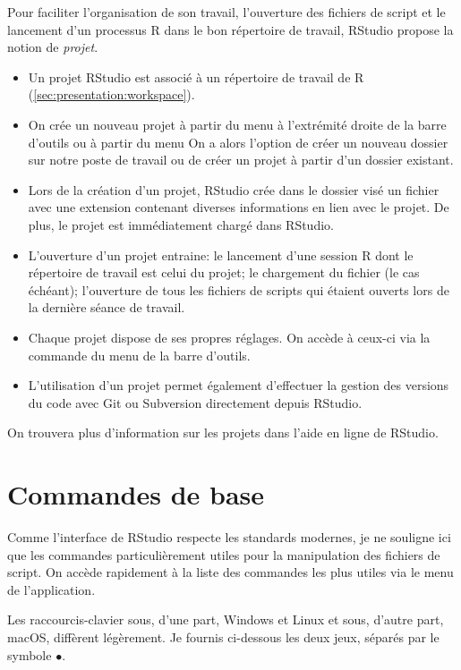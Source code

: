 Pour faciliter l'organisation de son travail, l'ouverture des fichiers
de script et le lancement d'un processus R dans le bon répertoire de
travail, RStudio propose la notion de \emph{projet}.
\begin{itemize}
\item Un projet RStudio est associé à un répertoire de travail de R
  (\autoref{sec:presentation:workspace}).
\item On crée un nouveau projet à partir du menu  à
  l'extrémité droite de la barre d'outils ou à partir du menu
   On a alors l'option de créer un nouveau
  dossier sur notre poste de travail ou de créer un projet à partir
  d'un dossier existant.
\item Lors de la création d'un projet, RStudio crée dans le dossier
  visé un fichier avec une extension  contenant diverses
  informations en lien avec le projet. De plus, le projet est
  immédiatement chargé dans RStudio.
\item L'ouverture d'un projet entraine: le lancement d'une session R
  dont le répertoire de travail est celui du projet; le
  chargement du fichier  (le cas échéant); l'ouverture de
  tous les fichiers de scripts qui étaient ouverts lors de la dernière
  séance de travail.
\item Chaque projet dispose de ses propres réglages. On accède à
  ceux-ci via la commande  du menu
   de la barre d'outils.
\item L'utilisation d'un projet permet également d'effectuer la
  gestion des versions du code avec Git ou Subversion
  directement depuis RStudio.
\end{itemize}

On trouvera plus d'information sur les projets dans l'aide en ligne
de RStudio.


\section{Commandes de base}
\label{sec:rstudio:commandes}

Comme l'interface de RStudio respecte les standards modernes, je ne
souligne ici que les commandes particulièrement utiles pour la
manipulation des fichiers de script. On accède rapidement à la liste
des commandes les plus utiles via le menu  de
l'application.

Les raccourcis-clavier sous, d'une part, Windows et Linux et sous,
d'autre part, macOS, diffèrent légèrement. Je fournis ci-dessous
les deux jeux, séparés par le symbole $\bullet$.

